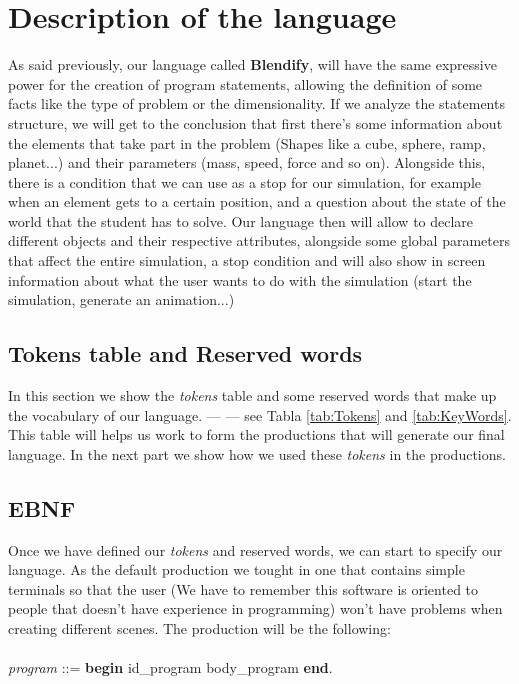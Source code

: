 \documentclass[12pt]{article}
\begin{document}
\section{Description of the language}

As said previously, our language called \textbf{Blendify}, will have the same expressive power for the creation of program statements, allowing the definition of some facts like the type of problem or the dimensionality. If we analyze the statements structure, we will get to the conclusion that first there's some information about the elements that take part in the problem (Shapes like a cube, sphere, ramp, planet...) and their parameters (mass, speed, force and so on). Alongside this, there is a condition that we can use as a stop for our simulation, for example when an element gets to a certain position, and a question about the state of the world that the student has to solve. Our language then will allow to declare different objects and their respective attributes, alongside some global parameters that affect the entire simulation, a stop condition and will also show in screen information about what the user wants to do with the simulation (start the simulation, generate an animation...)
\subsection{Tokens table and Reserved words}

In this section we show the \textit{tokens} table and some reserved words that make up the vocabulary of our language. --- ---  see Tabla \ref{tab:Tokens} and \ref{tab:KeyWords}. This table will helps us work to form the productions that will generate our final language. In the next part we show how we used these \textit{tokens} in the productions.

\subsection{EBNF}


Once we have defined our \textit{tokens} and reserved words, we can start to specify our language. As the default production we tought in one that contains simple terminals so that the user (We have to remember this software is oriented to people that doesn't have experience in programming) won't have problems when creating different scenes. The production will be the following: \\ \\
\noindent \textit{program} ::= \textbf{begin} id\_program body\_program \textbf{end}.
\end{document}
